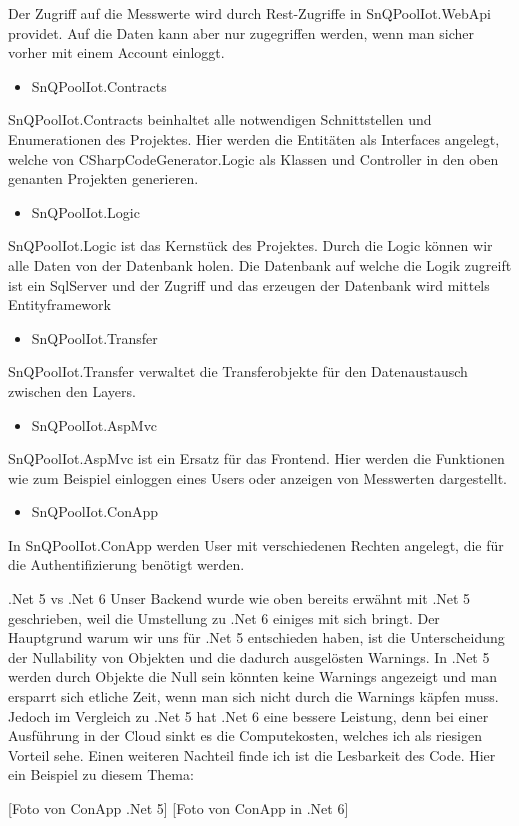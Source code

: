 Der Zugriff auf die Messwerte wird durch Rest-Zugriffe in SnQPoolIot.WebApi providet.
Auf die Daten kann aber nur zugegriffen werden, wenn man sicher vorher mit einem Account einloggt.  

\begin{itemize}
    \item SnQPoolIot.Contracts
\end{itemize}

SnQPoolIot.Contracts beinhaltet alle notwendigen Schnittstellen und Enumerationen des Projektes.
Hier werden die Entitäten als Interfaces angelegt, 
welche von CSharpCodeGenerator.Logic als Klassen und Controller in den oben genanten Projekten generieren.

\begin{itemize}
    \item SnQPoolIot.Logic
\end{itemize}

SnQPoolIot.Logic ist das Kernstück des Projektes. 
Durch die Logic können wir alle Daten von der Datenbank holen. 
Die Datenbank auf welche die Logik zugreift ist ein SqlServer und der Zugriff und das erzeugen der Datenbank wird mittels Entityframework

\begin{itemize}
    \item SnQPoolIot.Transfer
\end{itemize}

SnQPoolIot.Transfer verwaltet die Transferobjekte für den Datenaustausch zwischen den Layers.

\begin{itemize}
    \item SnQPoolIot.AspMvc
\end{itemize}

SnQPoolIot.AspMvc ist ein Ersatz für das Frontend.
Hier werden die Funktionen wie zum Beispiel einloggen eines Users oder anzeigen von Messwerten dargestellt.

\begin{itemize}
    \item SnQPoolIot.ConApp
\end{itemize}

In SnQPoolIot.ConApp werden User mit verschiedenen Rechten angelegt, die für die Authentifizierung benötigt werden.

.Net 5 vs .Net 6
Unser Backend wurde wie oben bereits erwähnt mit .Net 5 geschrieben, weil die Umstellung zu .Net 6 einiges mit sich bringt.
Der Hauptgrund warum wir uns für .Net 5 entschieden haben, ist die Unterscheidung der Nullability von Objekten und die dadurch ausgelösten Warnings.
In .Net 5 werden durch Objekte die Null sein könnten keine Warnings angezeigt und man ersparrt sich etliche Zeit, wenn man sich nicht durch die Warnings käpfen muss.
Jedoch im Vergleich zu .Net 5 hat .Net 6 eine bessere Leistung, denn bei einer Ausführung in der Cloud sinkt es die Computekosten, welches ich als riesigen Vorteil sehe.
Einen weiteren Nachteil finde ich ist die Lesbarkeit des Code.
Hier ein Beispiel zu diesem Thema:

[Foto von ConApp .Net 5] [Foto von ConApp in .Net 6]


